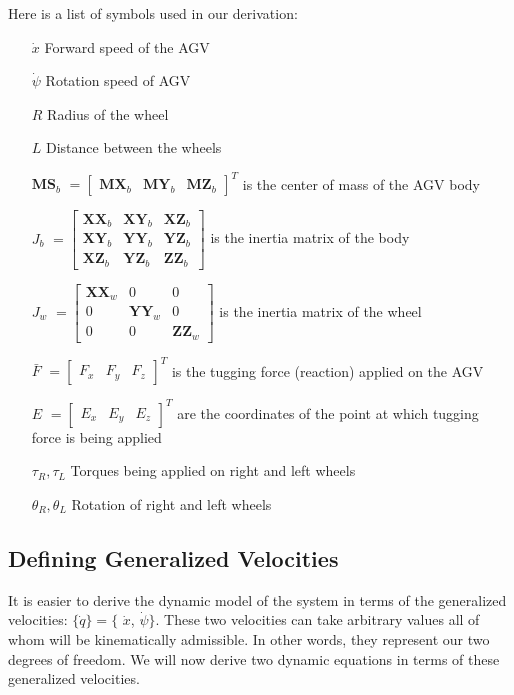 \documentclass[a4paper,10pt]{article}
\begin{document}
Here is a list of symbols used in our derivation:
\begin{itemize}[label={}]
 \item[$\dot{x}$] Forward speed of the AGV
 \item[$\dot\psi$] Rotation speed of AGV 
 \item[$R$] Radius of the wheel
 \item[$L$] Distance between the wheels 
  \item[$\mathbf{MS}_b$] $= \left[\begin{matrix} \mathbf{MX}_b & \mathbf{MY}_b & \mathbf{MZ}_b \end{matrix}\right]^T$ is the center of mass of the AGV body
 \item[$J_b$] $= \left[\begin{matrix} \mathbf{XX}_b & \mathbf{XY}_b & \mathbf{XZ}_b \\ \mathbf{XY}_b & \mathbf{YY}_b & \mathbf{YZ}_b \\ \mathbf{XZ}_b & \mathbf{YZ}_b & \mathbf{ZZ}_b \end{matrix} \right]$ is the inertia matrix of the body
 \item[$J_w$] $= \left[\begin{matrix} \mathbf{XX}_w & 0 & 0 \\ 0 & \mathbf{YY}_w & 0 \\ 0 & 0 & \mathbf{ZZ}_w \end{matrix} \right]$ is the inertia matrix of the wheel
 \item[$\bar{F}$] $= \left[\begin{matrix}  F_x & F_y & F_z  \end{matrix} \right]^T$ is the tugging force (reaction) applied on the AGV
 \item[$E$] $= \left[\begin{matrix}  E_x & E_y & E_z \end{matrix} \right]^T$ are the coordinates of the point at which tugging force is being applied
 \item[$\tau_R, \tau_L$] Torques being applied on right and left wheels
 \item[$\theta_R, \theta_L$] Rotation of right and left wheels
\end{itemize}


\subsection{Defining Generalized Velocities}
It is easier to derive the dynamic model of the system in terms of the generalized velocities:
$\{\dot{q}\} = \{$ $\dot{x}$, $\dot{\psi} \}$. These two velocities can take
arbitrary values all of whom will be kinematically admissible. In other words, they represent
our two degrees of freedom. 
We will now derive two dynamic equations in terms of these generalized velocities. 
\end{document}
